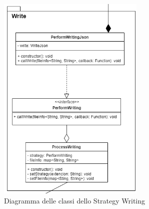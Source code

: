 				\begin{figure} [H]
					\begin{center}
					\includegraphics[width=70mm]{./img/Diagrammi/dAppW.png}
				\end{center}
					\caption{Diagramma delle classi dello Strategy Writing}
				\end{figure}
			
